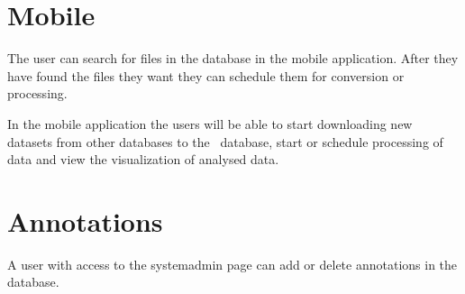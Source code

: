 \section{Mobile}
The user can search for files in the database in the mobile application. 
After they have found the files they want they can schedule them for conversion or processing.

In the mobile application the users will be able to start downloading new datasets from other databases to the \appName\ database, start or schedule processing of data and view the visualization of analysed data.

\section{Annotations}
A user with access to the systemadmin page can add or delete annotations in the database.


